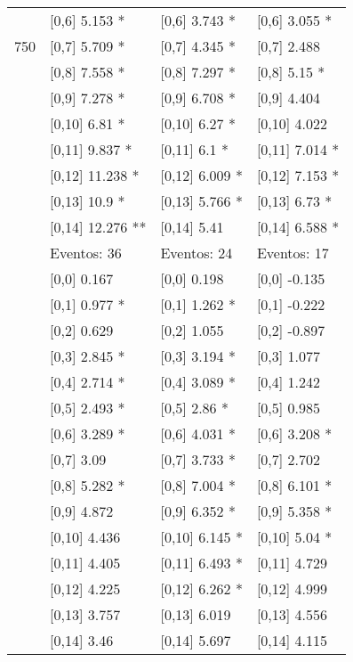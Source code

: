 \begin{table}
\begin{tabular}[t]{llll}
 & {}[0,6] 5.153 * & {}[0,6] 3.743 * & {}[0,6] 3.055 *\\
750 & {}[0,7] 5.709 * & {}[0,7] 4.345 * & {}[0,7] 2.488\\
\addlinespace
 & {}[0,8] 7.558 * & {}[0,8] 7.297 * & {}[0,8] 5.15 *\\
 & {}[0,9] 7.278 * & {}[0,9] 6.708 * & {}[0,9] 4.404\\
 & {}[0,10] 6.81 * & {}[0,10] 6.27 * & {}[0,10] 4.022\\
 & {}[0,11] 9.837 * & {}[0,11] 6.1 * & {}[0,11] 7.014 *\\
 & {}[0,12] 11.238 * & {}[0,12] 6.009 * & {}[0,12] 7.153 *\\
\addlinespace
 & {}[0,13] 10.9 * & {}[0,13] 5.766 * & {}[0,13] 6.73 *\\
 & {}[0,14] 12.276 ** & {}[0,14] 5.41 & {}[0,14] 6.588 *\\
 & Eventos:  36 & Eventos:  24 & Eventos:  17\\
 & {}[0,0] 0.167 & {}[0,0] 0.198 & {}[0,0] -0.135\\
 & {}[0,1] 0.977 * & {}[0,1] 1.262 * & {}[0,1] -0.222\\
\addlinespace
 & {}[0,2] 0.629 & {}[0,2] 1.055 & {}[0,2] -0.897\\
 & {}[0,3] 2.845 * & {}[0,3] 3.194 * & {}[0,3] 1.077\\
 & {}[0,4] 2.714 * & {}[0,4] 3.089 * & {}[0,4] 1.242\\
 & {}[0,5] 2.493 * & {}[0,5] 2.86 * & {}[0,5] 0.985\\
 & {}[0,6] 3.289 * & {}[0,6] 4.031 * & {}[0,6] 3.208 *\\
\addlinespace
1000 & {}[0,7] 3.09 & {}[0,7] 3.733 * & {}[0,7] 2.702\\
 & {}[0,8] 5.282 * & {}[0,8] 7.004 * & {}[0,8] 6.101 *\\
 & {}[0,9] 4.872 & {}[0,9] 6.352 * & {}[0,9] 5.358 *\\
 & {}[0,10] 4.436 & {}[0,10] 6.145 * & {}[0,10] 5.04 *\\
 & {}[0,11] 4.405 & {}[0,11] 6.493 * & {}[0,11] 4.729\\
\addlinespace
 & {}[0,12] 4.225 & {}[0,12] 6.262 * & {}[0,12] 4.999\\
 & {}[0,13] 3.757 & {}[0,13] 6.019 & {}[0,13] 4.556\\
 & {}[0,14] 3.46 & {}[0,14] 5.697 & {}[0,14] 4.115\\
\bottomrule
\end{tabular}
\end{table}

